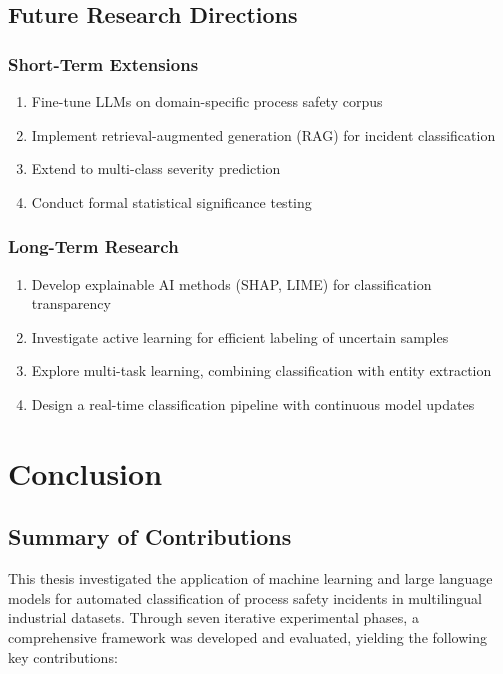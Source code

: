 \documentclass[11pt, titlepage, bibliography=totoc]{scrreprt}
\begin{document}
\section{Future Research Directions}

\subsection{Short-Term Extensions}
\begin{enumerate}
    \item Fine-tune LLMs on domain-specific process safety corpus
    \item Implement retrieval-augmented generation (RAG) for incident classification
    \item Extend to multi-class severity prediction
    \item Conduct formal statistical significance testing
\end{enumerate}

\subsection{Long-Term Research}
\begin{enumerate}
    \item Develop explainable AI methods (SHAP, LIME) for classification transparency
    \item Investigate active learning for efficient labeling of uncertain samples
    \item Explore multi-task learning, combining classification with entity extraction
    \item Design a real-time classification pipeline with continuous model updates
\end{enumerate}

\chapter{Conclusion}

\section{Summary of Contributions}

This thesis investigated the application of machine learning and large language models for automated classification of process safety incidents in multilingual industrial datasets. Through seven iterative experimental phases, a comprehensive framework was developed and evaluated, yielding the following key contributions:
\end{document}
